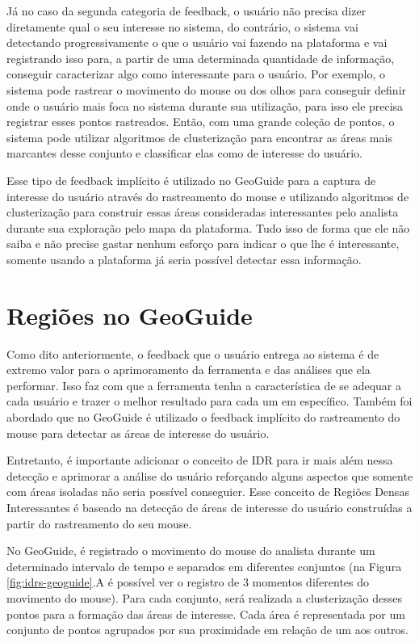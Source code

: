 Já no caso da segunda categoria de feedback, o usuário não precisa dizer diretamente qual o seu interesse no sistema, do contrário, o sistema vai detectando progressivamente o que o usuário vai fazendo na plataforma e vai registrando isso para, a partir de uma determinada quantidade de informação, conseguir caracterizar algo como interessante para o usuário. Por exemplo, o sistema pode rastrear o movimento do mouse ou dos olhos para conseguir definir onde o usuário mais foca no sistema durante sua utilização, para isso ele precisa registrar esses pontos rastreados. Então, com uma grande coleção de pontos, o sistema pode utilizar algoritmos de clusterização para encontrar as áreas mais marcantes desse conjunto e classificar elas como de interesse do usuário.

Esse tipo de feedback implícito é utilizado no GeoGuide para a captura de interesse do usuário através do rastreamento do mouse e utilizando algoritmos de clusterização para construir essas áreas consideradas interessantes pelo analista durante sua exploração pelo mapa da plataforma. Tudo isso de forma que ele não saiba e não precise gastar nenhum esforço para indicar o que lhe é interessante, somente usando a plataforma já seria possível detectar essa informação.

\section{Regiões no GeoGuide}

Como dito anteriormente, o feedback que o usuário entrega ao sistema é de extremo valor para o aprimoramento da ferramenta e das análises que ela performar. Isso faz com que a ferramenta tenha a característica de se adequar a cada usuário e trazer o melhor resultado para cada um em específico. Também foi abordado que no GeoGuide é utilizado o feedback implícito do rastreamento do mouse para detectar as áreas de interesse do usuário.

Entretanto, é importante adicionar o conceito de IDR para ir mais além nessa detecção e aprimorar a análise do usuário reforçando alguns aspectos que somente com áreas isoladas não seria possível conseguier. Esse conceito de Regiões Densas Interessantes é baseado na detecção de áreas de interesse do usuário construídas a partir do rastreamento do seu mouse.

No GeoGuide, é registrado o movimento do mouse do analista durante um determinado intervalo de tempo e separados em diferentes conjuntos (na Figura \ref{fig:idrs-geoguide}.A é possível ver o registro de 3 momentos diferentes do movimento do mouse). Para cada conjunto, será realizada a clusterização desses pontos para a formação das áreas de interesse. Cada área é representada por um conjunto de pontos agrupados por sua proximidade em relação de um aos outros.

